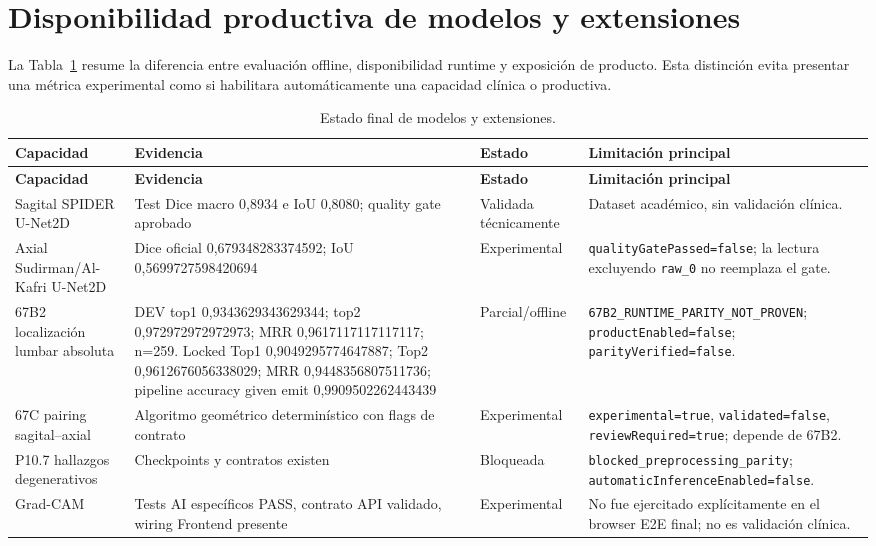 \section{Disponibilidad productiva de modelos y extensiones}

La Tabla~\ref{tab:cap-modelos-disponibilidad-final} resume la diferencia entre evaluación offline, disponibilidad runtime y exposición de producto. Esta distinción evita presentar una métrica experimental como si habilitara automáticamente una capacidad clínica o productiva.

{\scriptsize
\setlength{\LTleft}{0pt}
\setlength{\LTright}{0pt}
\setlength{\tabcolsep}{3pt}
\renewcommand{\arraystretch}{1.18}
\begin{longtable}{>{\raggedright\arraybackslash}p{} >{\raggedright\arraybackslash}p{} >{\raggedright\arraybackslash}p{} >{\raggedright\arraybackslash}p{}}
\caption{Estado final de modelos y extensiones.}\label{tab:cap-modelos-disponibilidad-final}\\
\hline
\textbf{Capacidad} & \textbf{Evidencia} & \textbf{Estado} & \textbf{Limitación principal} \\
\hline
\endfirsthead
\hline
\textbf{Capacidad} & \textbf{Evidencia} & \textbf{Estado} & \textbf{Limitación principal} \\
\hline
\endhead
\hline
\endfoot
Sagital SPIDER U-Net2D & Test Dice macro 0,8934 e IoU 0,8080; quality gate aprobado & Validada técnicamente & Dataset académico, sin validación clínica. \\
Axial Sudirman/Al-Kafri U-Net2D & Dice oficial 0,679348283374592; IoU 0,5699727598420694 & Experimental & \texttt{qualityGatePassed=false}; la lectura excluyendo \texttt{raw\_0} no reemplaza el gate. \\
67B2 localización lumbar absoluta & DEV top1 0,9343629343629344; top2 0,972972972972973; MRR 0,9617117117117117; n=259. Locked Top1 0,9049295774647887; Top2 0,9612676056338029; MRR 0,9448356807511736; pipeline accuracy given emit 0,9909502262443439 & Parcial/offline & \texttt{67B2\_RUNTIME\_PARITY\_NOT\_PROVEN}; \texttt{productEnabled=false}; \texttt{parityVerified=false}. \\
67C pairing sagital--axial & Algoritmo geométrico determinístico con flags de contrato & Experimental & \texttt{experimental=true}, \texttt{validated=false}, \texttt{reviewRequired=true}; depende de 67B2. \\
P10.7 hallazgos degenerativos & Checkpoints y contratos existen & Bloqueada & \texttt{blocked\_preprocessing\_parity}; \texttt{automaticInferenceEnabled=false}. \\
Grad-CAM & Tests AI específicos PASS, contrato API validado, wiring Frontend presente & Experimental & No fue ejercitado explícitamente en el browser E2E final; no es validación clínica. \\
\hline
\end{longtable}
}

